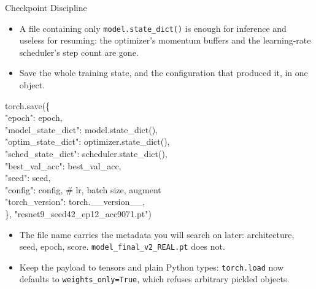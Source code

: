 \begin{frame}[allowframebreaks]{Checkpoint Discipline}
\begin{itemize}
    \item A file containing only \texttt{model.state\_dict()} is enough for inference and useless for resuming: the optimizer's momentum buffers and the learning-rate scheduler's step count are gone.
    \item Save the whole training state, and the configuration that produced it, in one object.
\end{itemize}

\framebreak
    \ttfamily\footnotesize{
    torch.save(\{ \\
    \hspace{1em}    "epoch": epoch, \\
    \hspace{1em}    "model\_state\_dict": model.state\_dict(), \\
    \hspace{1em}    "optim\_state\_dict": optimizer.state\_dict(), \\
    \hspace{1em}    "sched\_state\_dict": scheduler.state\_dict(), \\
    \hspace{1em}    "best\_val\_acc": best\_val\_acc, \\
    \hspace{1em}    "seed": seed, \\
    \hspace{1em}    "config": config, \# lr, batch size, augment \\
    \hspace{1em}    "torch\_version": torch.\_\_version\_\_, \\
    \}, "resnet9\_seed42\_ep12\_acc9071.pt")
    }
\vspace{1em}
\begin{itemize}
    \item The file name carries the metadata you will search on later: architecture, seed, epoch, score. \texttt{model\_final\_v2\_REAL.pt} does not.
    \item Keep the payload to tensors and plain Python types: \texttt{torch.load} now defaults to \texttt{weights\_only=True}, which refuses arbitrary pickled objects.
\end{itemize}
\end{frame}

